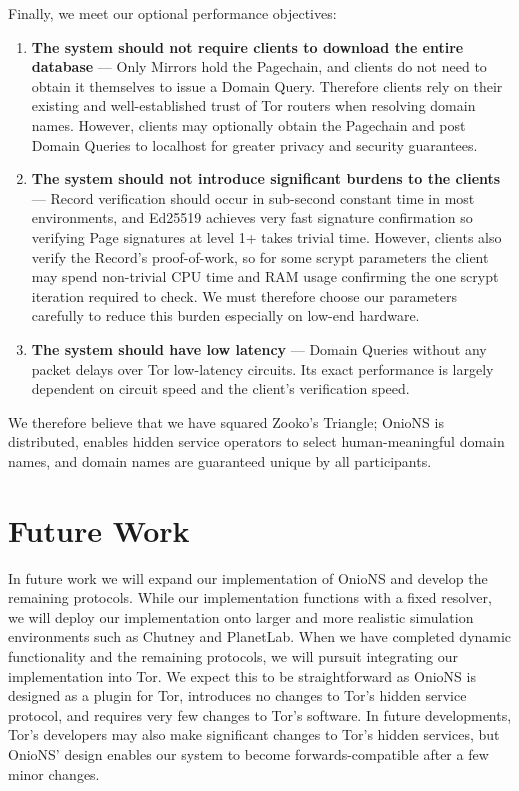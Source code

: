 \documentclass{sig-alternate}
\begin{document}
Finally, we meet our optional performance objectives:

\begin{enumerate}
	\item \textbf{The system should not require clients to download the entire database} --- Only Mirrors hold the Pagechain, and clients do not need to obtain it themselves to issue a Domain Query. Therefore clients rely on their existing and well-established trust of Tor routers when resolving domain names. However, clients may optionally obtain the Pagechain and post Domain Queries to localhost for greater privacy and security guarantees.
	\item \textbf{The system should not introduce significant burdens to the clients} --- Record verification should occur in sub-second constant time in most environments, and Ed25519 achieves very fast signature confirmation so verifying Page signatures at level 1+ takes trivial time. However, clients also verify the Record's proof-of-work, so for some scrypt parameters the client may spend non-trivial CPU time and RAM usage confirming the one scrypt iteration required to check. We must therefore choose our parameters carefully to reduce this burden especially on low-end hardware.
	\item \textbf{The system should have low latency} --- Domain Queries without any packet delays over Tor low-latency circuits. Its exact performance is largely dependent on circuit speed and the client's verification speed.
\end{enumerate}

We therefore believe that we have squared Zooko's Triangle; OnioNS is distributed, enables hidden service operators to select human-meaningful domain names, and domain names are guaranteed unique by all participants.

\section{Future Work}

In future work we will expand our implementation of OnioNS and develop the remaining protocols. While our implementation functions with a fixed resolver, we will deploy our implementation onto larger and more realistic simulation environments such as Chutney and PlanetLab. When we have completed dynamic functionality and the remaining protocols, we will pursuit integrating our implementation into Tor. We expect this to be straightforward as OnioNS is designed as a plugin for Tor, introduces no changes to Tor's hidden service protocol, and requires very few changes to Tor's software. In future developments, Tor's developers may also make significant changes to Tor's hidden services, but OnioNS' design enables our system to become forwards-compatible after a few minor changes.
\end{document}

